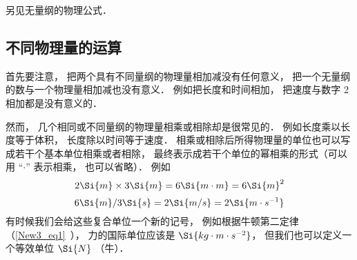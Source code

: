 另见无量纲的物理公式．

\subsection{不同物理量的运算}
首先要注意， 把两个具有不同量纲的物理量相加减没有任何意义， 把一个无量纲的数与一个物理量相加减也没有意义． 例如把长度和时间相加， 把速度与数字 2 相加都是没有意义的．

然而， 几个相同或不同量纲的物理量相乘或相除却是很常见的． 例如长度乘以长度等于体积， 长度除以时间等于速度． 相乘或相除后所得物理量的单位也可以写成若干个基本单位相乘或者相除， 最终表示成若干个单位的幂相乘的形式（可以用 “$\cdot$” 表示相乘， 也可以省略）． 例如
\begin{equation}
2\Si{m} \times 3\Si{m} = 6\Si{m\cdot m} = 6\Si{m}^2
\end{equation}
\begin{equation}
6\Si{m} / 3\Si{s} = 2 \Si{m/s} = 2 \Si{m \cdot s^{-1}}
\end{equation}
有时候我们会给这些复合单位一个新的记号， 例如根据牛顿第二定律（\autoref{New3_eq1}~）， 力的国际单位应该是 $\Si{kg\cdot m\cdot s^{-2}}$， 但我们也可以定义一个等效单位 $\Si{N}$ （牛）．


